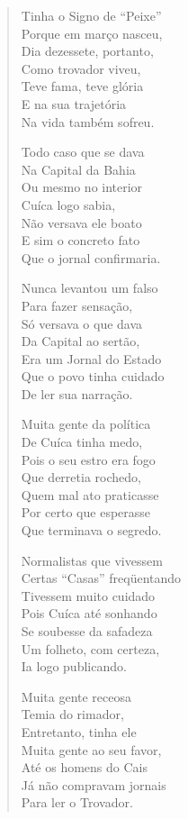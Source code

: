 \begin{verse}
Tinha o Signo de ``Peixe'' \\
Porque em março nasceu, \\
Dia dezessete, portanto, \\
Como trovador viveu, \\
Teve fama, teve glória \\
E na sua trajetória \\
Na vida também sofreu. 
\pagebreak

Todo caso que se dava \\
Na Capital da Bahia \\
Ou mesmo no interior \\
Cuíca logo sabia, \\
Não versava ele boato \\
E sim o concreto fato \\
Que o jornal confirmaria. 

Nunca levantou um falso \\
Para fazer sensação, \\
Só versava o que dava \\
Da Capital ao sertão, \\
Era um Jornal do Estado \\
Que o povo tinha cuidado \\
De ler sua narração. 

Muita gente da política \\
De Cuíca tinha medo, \\
Pois o seu estro era fogo \\
Que derretia rochedo, \\
Quem mal ato praticasse \\
Por certo que esperasse \\
Que terminava o segredo. 

Normalistas que vivessem \\
Certas ``Casas'' freqüentando \\
Tivessem muito cuidado \\
Pois Cuíca até sonhando \\
Se soubesse da safadeza \\
Um folheto, com certeza, \\
Ia logo publicando. 
\pagebreak

Muita gente receosa \\
Temia do rimador, \\
Entretanto, tinha ele \\
Muita gente ao seu favor, \\
Até os homens do Cais \\
Já não compravam jornais \\
Para ler o Trovador. 


\end{verse}
